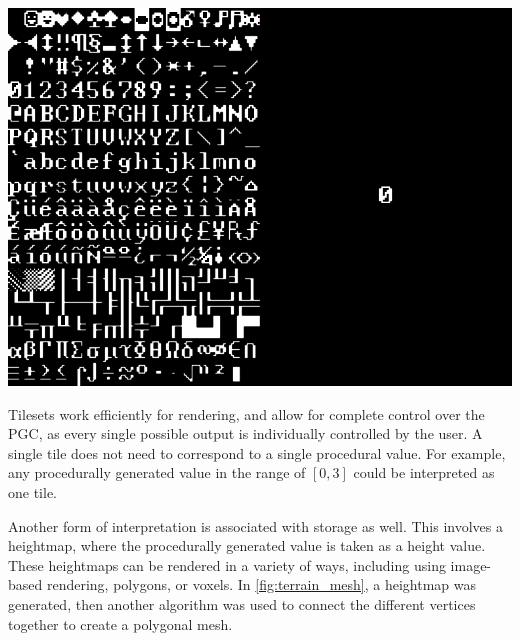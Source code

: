 \documentclass[10pt]{report}
\begin{document}
		\begin{minipage}{\textwidth}
			\centering
			\includegraphics[scale=0.3]{Curses_1920x900}
			\label{fig:Curses_1920x900}
		\end{minipage}
	
		Tilesets work efficiently for rendering, and allow for complete control over the PGC, as every single possible output is individually controlled by the user. A single tile does not need to correspond to a single procedural value. For example, any procedurally generated value in the range of \([0,3]\) could be interpreted as one tile. 
		
		Another form of interpretation is associated with storage as well. This involves a heightmap, where the procedurally generated value is taken as a height value. These heightmaps can be rendered in a variety of ways, including using image-based rendering, polygons, or voxels. In \autoref{fig:terrain_mesh}, a heightmap was generated, then another algorithm was used to connect the different vertices together to create a polygonal mesh. 
		
\end{document}
